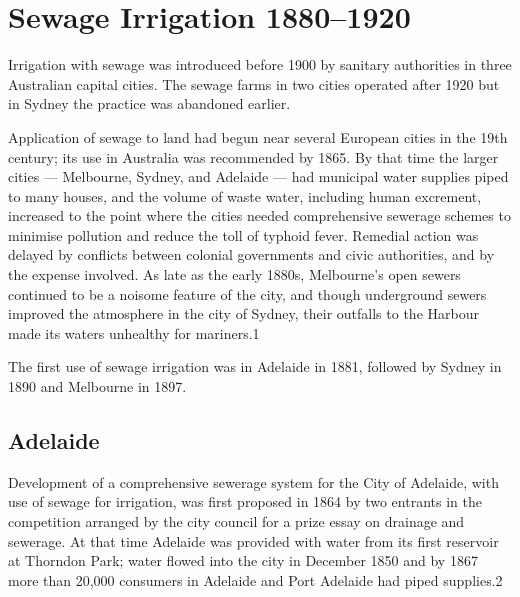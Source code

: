 
\chapter{Sewage Irrigation 1880--1920}

Irrigation with sewage was introduced before 1900 by sanitary
authorities in three Australian capital cities.  The sewage farms in
two cities operated after 1920 but in Sydney the practice was
abandoned earlier.

Application of sewage to land had begun near several European cities
in the 19th century; its use in Australia was recommended by 1865.  By
that time the larger cities --- Melbourne, Sydney, and Adelaide ---
had municipal water supplies piped to many houses, and the volume of
waste water, including human excrement, increased to the point where
the cities needed comprehensive sewerage schemes to minimise pollution
and reduce the toll of typhoid fever.  Remedial action was delayed by
conflicts between colonial governments and civic authorities, and by
the expense involved.  As late as the early 1880s, Melbourne's open
sewers continued to be a noisome feature of the city, and though
underground sewers improved the atmosphere in the city of Sydney,
their outfalls to the Harbour made its waters unhealthy for mariners.1

The first use of sewage irrigation was in Adelaide in 1881, followed
by Sydney in 1890 and Melbourne in 1897.

\section{Adelaide}

Development of a comprehensive sewerage system for the City of
Adelaide, with use of sewage for irrigation, was first proposed in
1864 by two entrants in the competition arranged by the city council
for a prize essay on drainage and sewerage.  At that time Adelaide was
provided with water from its first reservoir at Thorndon Park; water
flowed into the city in December 1850 and by 1867 more than 20,000
consumers in Adelaide and Port Adelaide had piped supplies.2

